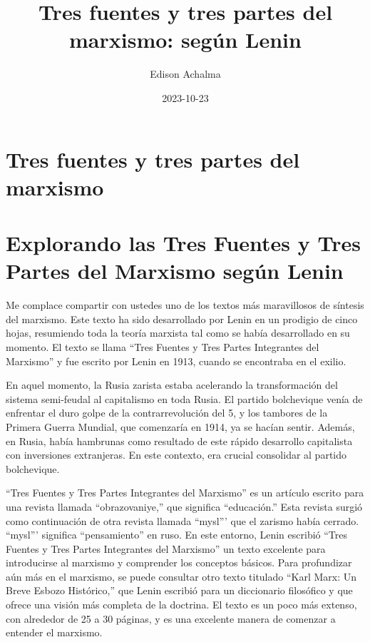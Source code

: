 \documentclass[
  jou,
  floatsintext,
  longtable,
  a4paper,
  nolmodern,
  notxfonts,
  notimes,
  colorlinks=true,linkcolor=blue,citecolor=blue,urlcolor=blue]{apa7}
\title{Tres fuentes y tres partes del marxismo: según Lenin}
\author{Edison Achalma}
\affiliation{
{Escuela Profesional de Economía, Universidad Nacional de San Cristóbal
de Huamanga}}
\date{2023-10-23}
\begin{document}
\maketitle

\hypertarget{toc}{}
\tableofcontents
\newpage
\section[Introduction]{Tres fuentes y tres partes del marxismo}

\setcounter{secnumdepth}{-\maxdimen} %

\setlength\LTleft{0pt}


\section{Explorando las Tres Fuentes y Tres Partes del Marxismo según
Lenin}\label{explorando-las-tres-fuentes-y-tres-partes-del-marxismo-seguxfan-lenin}

Me complace compartir con ustedes uno de los textos más maravillosos de
síntesis del marxismo. Este texto ha sido desarrollado por Lenin en un
prodigio de cinco hojas, resumiendo toda la teoría marxista tal como se
había desarrollado en su momento. El texto se llama ``Tres Fuentes y
Tres Partes Integrantes del Marxismo'' y fue escrito por Lenin en 1913,
cuando se encontraba en el exilio.

En aquel momento, la Rusia zarista estaba acelerando la transformación
del sistema semi-feudal al capitalismo en toda Rusia. El partido
bolchevique venía de enfrentar el duro golpe de la contrarrevolución del
5, y los tambores de la Primera Guerra Mundial, que comenzaría en 1914,
ya se hacían sentir. Además, en Rusia, había hambrunas como resultado de
este rápido desarrollo capitalista con inversiones extranjeras. En este
contexto, era crucial consolidar al partido bolchevique.

``Tres Fuentes y Tres Partes Integrantes del Marxismo'' es un artículo
escrito para una revista llamada ``obrazovaniye,'' que significa
``educación.'' Esta revista surgió como continuación de otra revista
llamada ``mysl''' que el zarismo había cerrado. ``mysl''' significa
``pensamiento'' en ruso. En este entorno, Lenin escribió ``Tres Fuentes
y Tres Partes Integrantes del Marxismo'' un texto excelente para
introducirse al marxismo y comprender los conceptos básicos. Para
profundizar aún más en el marxismo, se puede consultar otro texto
titulado ``Karl Marx: Un Breve Esbozo Histórico,'' que Lenin escribió
para un diccionario filosófico y que ofrece una visión más completa de
la doctrina. El texto es un poco más extenso, con alrededor de 25 a 30
páginas, y es una excelente manera de comenzar a entender el marxismo.
\end{document}
